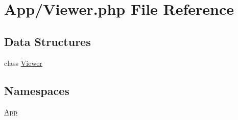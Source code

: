 \hypertarget{_viewer_8php}{}\section{App/\+Viewer.php File Reference}
\label{_viewer_8php}
\subsection*{Data Structures}
\begin{DoxyCompactItemize}
\item 
class \hyperlink{class_app_1_1_viewer}{Viewer}
\end{DoxyCompactItemize}
\subsection*{Namespaces}
\begin{DoxyCompactItemize}
\item 
 \hyperlink{namespace_app}{App}
\end{DoxyCompactItemize}
